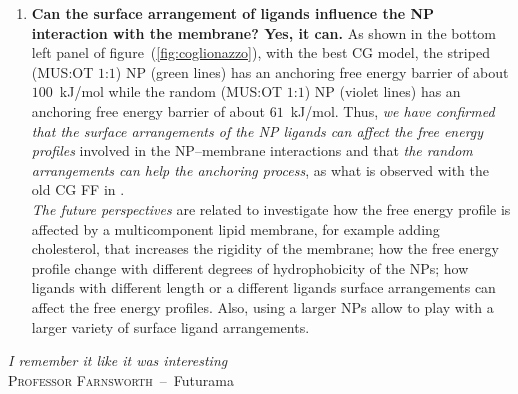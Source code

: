 \begin{enumerate}[label=\itshape\roman*.,listparindent=1em]
	\item \textbf{\textsf{Can the surface arrangement of ligands influence the \ac{NP} interaction with the membrane? Yes, it can.}} As shown in the bottom left panel of figure~(\ref{fig:coglionazzo}), with the best \ac{CG} model, the striped (\acs{MUS}:\acs{OT} $1$:$1$) \ac{NP} (green lines) has an anchoring free energy barrier of about $100$~kJ/mol while the random (\acs{MUS}:\acs{OT} $1$:$1$) \ac{NP} (violet lines) has an anchoring free energy barrier of about $61$~kJ/mol. Thus, \textit{we have confirmed that the surface arrangements of the \ac{NP} ligands can affect the free energy profiles} involved in the \ac{NP}--membrane interactions and that \textit{the random arrangements can help the anchoring process}, as what is observed with the old \ac{CG} \ac{FF} in \cite{ourPaper}.
	\\\indent\textit{The future perspectives} are related to investigate how the free energy profile is affected by a multicomponent lipid membrane, for example adding cholesterol, that increases the rigidity of the membrane; how the free energy profile change with different degrees of hydrophobicity of the \acp{NP}; how ligands with different length or a different ligands surface arrangements can affect the free energy profiles. Also, using a larger \acp{NP} allow to play with a larger variety of surface ligand arrangements.
\end{enumerate}

\vfill
\begin{flushright}
	\textsl{I remember it like it was interesting}\\\smallskip
	\footnotesize\textsc{\sffamily Professor Farnsworth}\ --\ \textsf{Futurama}
\end{flushright}
